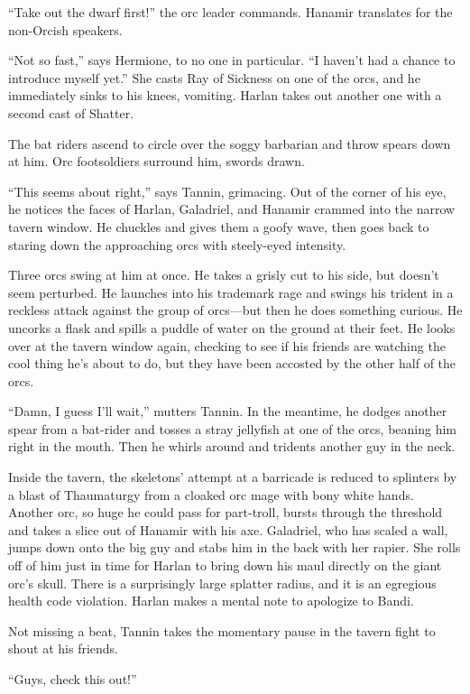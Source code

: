 \documentclass[smalldemyvopaper,11pt,twoside,onecolumn,openright,extrafontsizes]{memoir}
\begin{document}
``Take out the dwarf first!'' the orc leader commands. Hanamir
translates for the non-Orcish speakers.

``Not so fast,'' says Hermione, to no one in particular. ``I haven't had
a chance to introduce myself yet.'' She casts Ray of Sickness on one of
the orcs, and he immediately sinks to his knees, vomiting. Harlan takes
out another one with a second cast of Shatter.

The bat riders ascend to circle over the soggy barbarian and throw
spears down at him. Orc footsoldiers surround him, swords drawn.

``This seems about right,'' says Tannin, grimacing. Out of the corner of
his eye, he notices the faces of Harlan, Galadriel, and Hanamir crammed
into the narrow tavern window. He chuckles and gives them a goofy wave,
then goes back to staring down the approaching orcs with steely-eyed
intensity.

Three orcs swing at him at once. He takes a grisly cut to his side, but
doesn't seem perturbed. He launches into his trademark rage and swings
his trident in a reckless attack against the group of orcs---but then he
does something curious. He uncorks a flask and spills a puddle of water
on the ground at their feet. He looks over at the tavern window again,
checking to see if his friends are watching the cool thing he's about to
do, but they have been accosted by the other half of the orcs.

``Damn, I guess I'll wait,'' mutters Tannin. In the meantime, he dodges
another spear from a bat-rider and tosses a stray jellyfish at one of
the orcs, beaning him right in the mouth. Then he whirls around and
tridents another guy in the neck.

Inside the tavern, the skeletons' attempt at a barricade is reduced to
splinters by a blast of Thaumaturgy from a cloaked orc mage with bony
white hands. Another orc, so huge he could pass for part-troll, bursts
through the threshold and takes a slice out of Hanamir with his axe.
Galadriel, who has scaled a wall, jumps down onto the big guy and stabs
him in the back with her rapier. She rolls off of him just in time for
Harlan to bring down his maul directly on the giant orc's skull. There
is a surprisingly large splatter radius, and it is an egregious health
code violation. Harlan makes a mental note to apologize to Bandi.

Not missing a beat, Tannin takes the momentary pause in the tavern fight
to shout at his friends.

``Guys, check this out!''
\end{document}

